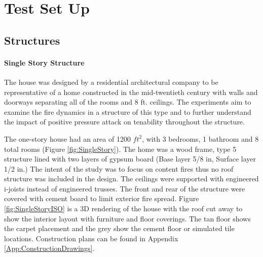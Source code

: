 \documentclass{article}
\begin{document}
\clearpage

\section{Test Set Up}

\subsection{Structures}

\paragraph{Single Story Structure} \mbox{}

The house was designed by a residential architectural company to be representative of a home constructed in the mid-twentieth century with walls and doorways separating all of the rooms and 8 ft. ceilings. The experiments aim to examine the fire dynamics in a structure of this type and to further understand the impact of positive pressure attack on tenability throughout the structure.

The one-story house had an area of 1200 $ft^2$, with 3 bedrooms, 1 bathroom and 8 total rooms (Figure \ref{fig:SingleStory}). The home was a wood frame, type 5 structure lined with two layers of gypsum board (Base layer 5/8 in, Surface layer 1/2 in.) The intent of the study was to focus on content fires thus no roof structure was included in the design. The ceilings were supported with engineered i-joists instead of engineered trusses. The front and rear of the structure were covered with cement board to limit exterior fire spread. Figure \ref{fig:SingleStoryISO} is a 3D rendering of the house with the roof cut away to show the interior layout with furniture and floor coverings. The tan floor shows the carpet placement and the grey show the cement floor or simulated tile locations. Construction plans can be found in Appendix \ref{App:ConstructionDrawings}.
\end{document}
